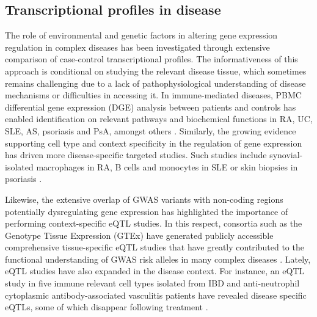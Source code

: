 \subsection{Transcriptional profiles in disease}
The role of environmental and genetic factors in altering gene expression regulation in complex diseases has been investigated through extensive comparison of case-control transcriptional profiles. The informativeness of this approach is conditional on studying the relevant disease tissue, which sometimes remains challenging due to a lack of pathophysiological understanding of disease mechanisms or difficulties in accessing it. In immune-mediated diseases, PBMC differential gene expression (DGE) analysis between patients and controls has enabled identification on relevant pathways and biochemical functions in RA, UC, SLE, AS, psoriasis and PsA, amongst others \parencite{Miao2013,Junta2009,Baechler2003,Assassi2010,Batliwalla2005}.  Similarly, the growing evidence supporting cell type and context specificity in the regulation of gene expression has driven more disease-specific targeted studies. Such studies include synovial-isolated macrophages in RA, B cells and monocytes in SLE or skin biopsies in psoriasis \parencite{Katschke2001,Dozmorov2015,Jabbari2012}. 


Likewise, the extensive overlap of GWAS variants with non-coding regions potentially dysregulating gene expression has highlighted the importance of performing context-specific eQTL studies. In this respect, consortia such as the Genotype Tissue Expression (GTEx) have generated publicly accessible comprehensive tissue-specific eQTL studies that have greatly contributed to the functional understanding of GWAS risk alleles in many complex diseases . Lately, eQTL studies have also expanded in the disease context. For instance, an eQTL study in five immune relevant cell types isolated from IBD and anti-neutrophil cytoplasmic antibody-associated vasculitis patients have revealed disease specific eQTLs, some of which disappear following treatment \parencite{Peters2016}.

